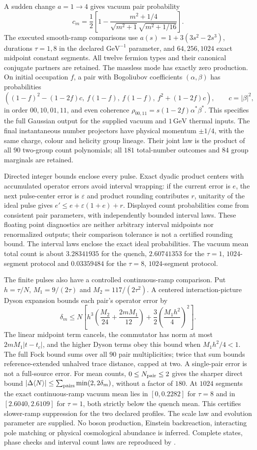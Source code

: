 A sudden change $a=1\to4$ gives vacuum pair probability
\[
 c_m=\frac12\left[1-
 \frac{m^2+1/4}{\sqrt{m^2+1}\sqrt{m^2+1/16}}\right].
\]
The executed smooth-ramp comparisons use
$a(s)=1+3(3s^2-2s^3)$, durations $\tau=1,8$ in the declared
$\mathrm{GeV}^{-1}$ parameter, and $64,256,1024$ exact midpoint
constant segments. All twelve fermion types and their canonical
conjugate partners are retained. The massless mode has exactly zero
production. On initial occupation $f$, a pair with Bogoliubov coefficients
$(\alpha,\beta)$ has probabilities
\[
 ((1-f)^2-(1-2f)c,\ f(1-f),\ f(1-f),\ f^2+(1-2f)c),
 \qquad c=|\beta|^2,
\]
in order $00,10,01,11$, and even coherence
$\rho_{00,11}=s(1-2f)\alpha^*\beta^*$. This specifies the full Gaussian
output for the supplied vacuum and $1\,\mathrm{GeV}$ thermal inputs.
The final instantaneous number projectors have physical momentum
$\pm1/4$, with the same charge, colour and helicity group lineage.
Their joint law is the product of all $90$ two-group count polynomials;
all $181$ total-number outcomes and $84$ group marginals are retained.

Directed integer bounds enclose every pulse. Exact dyadic product centers
with accumulated operator errors avoid interval wrapping: if the current
error is $e$, the next pulse-center error is $\varepsilon$ and product
rounding contributes $r$, unitarity of the ideal pulse gives
$e'\leq e+\varepsilon(1+e)+r$. Displayed count probabilities come from
consistent pair parameters, with independently bounded interval laws.
These floating point diagnostics are neither arbitrary interval midpoints
nor renormalized outputs; their comparison tolerance is not a certified
rounding bound. The interval laws enclose the exact ideal probabilities.
The vacuum mean total count is about $3.28341935$ for the quench,
$2.60741353$ for the $\tau=1$, $1024$-segment protocol and
$0.03359484$ for the $\tau=8$, $1024$-segment protocol.

The finite pulses also have a controlled continuous-ramp comparison.
Put $h=\tau/N$, $M_1=9/(2\tau)$ and $M_2=117/(2\tau^2)$.
A centered interaction-picture Dyson expansion bounds each pair's
operator error by
\[
 \delta_m\leq N\left[
 h^3\left(\frac{M_2}{24}+\frac{2mM_1}{12}\right)
 +\frac32\left(\frac{M_1h^2}{4}\right)^2\right].
\]
The linear midpoint term cancels, the commutator has norm at most
$2mM_1|t-t_c|$, and the higher Dyson terms obey this bound when
$M_1h^2/4<1$. The full Fock bound sums over all $90$ pair multiplicities;
twice that sum bounds reference-extended unhalved trace distance,
capped at two. A single-pair error is not a full-source error. For mean counts,
$0\leq N_{\rm pair}\leq2$ gives the sharper direct bound
$|\Delta\langle N\rangle|\leq\sum_{\rm pairs}\min(2,2\delta_m)$,
without a factor of $180$. At $1024$ segments the exact continuous-ramp
vacuum mean lies in $[0,0.2282]$ for $\tau=8$ and in
$[2.6040,2.6109]$ for $\tau=1$, both strictly below the quench mean.
This certifies slower-ramp suppression for the two declared profiles.
The scale law and evolution parameter are supplied. No boson production,
Einstein backreaction, interacting pole matching or physical cosmological
abundance is inferred. Complete states, phase checks and interval count
laws are reproduced by 
\cite{ophrepo}.
